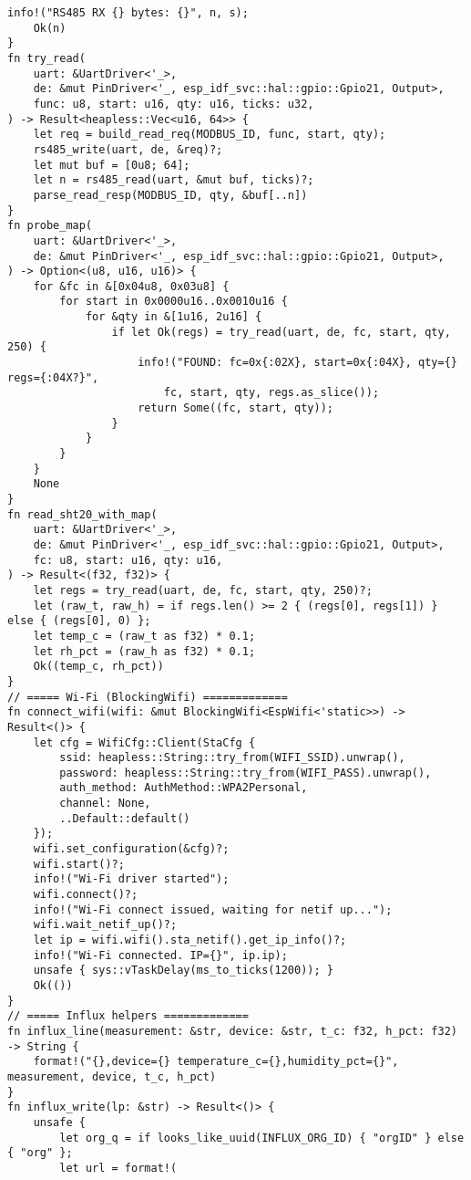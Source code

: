 \documentclass[a4paper, 12pt]{article}
\begin{document}
\begin{lstlisting}[style=ruststyle, caption={main.rs}, basicstyle=\ttfamily\tiny]
    info!("RS485 RX {} bytes: {}", n, s);
    Ok(n)
}
fn try_read(
    uart: &UartDriver<'_>,
    de: &mut PinDriver<'_, esp_idf_svc::hal::gpio::Gpio21, Output>,
    func: u8, start: u16, qty: u16, ticks: u32,
) -> Result<heapless::Vec<u16, 64>> {
    let req = build_read_req(MODBUS_ID, func, start, qty);
    rs485_write(uart, de, &req)?;
    let mut buf = [0u8; 64];
    let n = rs485_read(uart, &mut buf, ticks)?;
    parse_read_resp(MODBUS_ID, qty, &buf[..n])
}
fn probe_map(
    uart: &UartDriver<'_>,
    de: &mut PinDriver<'_, esp_idf_svc::hal::gpio::Gpio21, Output>,
) -> Option<(u8, u16, u16)> {
    for &fc in &[0x04u8, 0x03u8] {
        for start in 0x0000u16..0x0010u16 {
            for &qty in &[1u16, 2u16] {
                if let Ok(regs) = try_read(uart, de, fc, start, qty, 250) {
                    info!("FOUND: fc=0x{:02X}, start=0x{:04X}, qty={} regs={:04X?}",
                        fc, start, qty, regs.as_slice());
                    return Some((fc, start, qty));
                }
            }
        }
    }
    None
}
fn read_sht20_with_map(
    uart: &UartDriver<'_>,
    de: &mut PinDriver<'_, esp_idf_svc::hal::gpio::Gpio21, Output>,
    fc: u8, start: u16, qty: u16,
) -> Result<(f32, f32)> {
    let regs = try_read(uart, de, fc, start, qty, 250)?;
    let (raw_t, raw_h) = if regs.len() >= 2 { (regs[0], regs[1]) } else { (regs[0], 0) };
    let temp_c = (raw_t as f32) * 0.1;
    let rh_pct = (raw_h as f32) * 0.1;
    Ok((temp_c, rh_pct))
}
// ===== Wi-Fi (BlockingWifi) =============
fn connect_wifi(wifi: &mut BlockingWifi<EspWifi<'static>>) -> Result<()> {
    let cfg = WifiCfg::Client(StaCfg {
        ssid: heapless::String::try_from(WIFI_SSID).unwrap(),
        password: heapless::String::try_from(WIFI_PASS).unwrap(),
        auth_method: AuthMethod::WPA2Personal,
        channel: None,
        ..Default::default()
    });
    wifi.set_configuration(&cfg)?;
    wifi.start()?;
    info!("Wi-Fi driver started");
    wifi.connect()?;
    info!("Wi-Fi connect issued, waiting for netif up...");
    wifi.wait_netif_up()?;
    let ip = wifi.wifi().sta_netif().get_ip_info()?;
    info!("Wi-Fi connected. IP={}", ip.ip);
    unsafe { sys::vTaskDelay(ms_to_ticks(1200)); }
    Ok(())
}
// ===== Influx helpers =============
fn influx_line(measurement: &str, device: &str, t_c: f32, h_pct: f32) -> String {
    format!("{},device={} temperature_c={},humidity_pct={}", measurement, device, t_c, h_pct)
}
fn influx_write(lp: &str) -> Result<()> {
    unsafe {
        let org_q = if looks_like_uuid(INFLUX_ORG_ID) { "orgID" } else { "org" };
        let url = format!(

\end{lstlisting}
\end{document}
